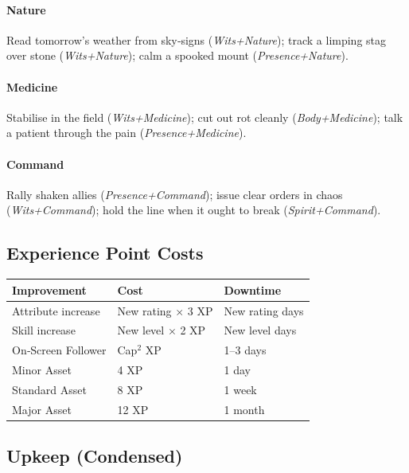 \paragraph{Nature}
Read tomorrow's weather from sky‑signs (\emph{Wits+Nature}); track a limping stag over stone (\emph{Wits+Nature}); calm a spooked mount (\emph{Presence+Nature}).

\paragraph{Medicine}
Stabilise in the field (\emph{Wits+Medicine}); cut out rot cleanly (\emph{Body+Medicine}); talk a patient through the pain (\emph{Presence+Medicine}).

\paragraph{Command}
Rally shaken allies (\emph{Presence+Command}); issue clear orders in chaos (\emph{Wits+Command}); hold the line when it ought to break (\emph{Spirit+Command}).

\subsection{Experience Point Costs}\label{subsec:xp_costs_ref}

\begin{center}
\feTableStart
\begin{tabularx}{\linewidth}{@{}l l l @{}}
\toprule
\textbf{Improvement} & \textbf{Cost} & \textbf{Downtime} \\
\midrule
Attribute increase & New rating $\times$ 3 XP & New rating days \\
Skill increase & New level $\times$ 2 XP & New level days \\
On‑Screen Follower & Cap\(^{2}\) XP & 1--3 days \\
Minor Asset & 4 XP & 1 day \\
Standard Asset & 8 XP & 1 week \\
Major Asset & 12 XP & 1 month \\
\bottomrule
\end{tabularx}
\feTableEnd
\end{center}

\subsection{Upkeep (Condensed)}\label{subsec:upkeep_srd}

